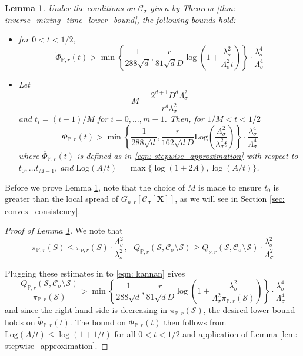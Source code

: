 \documentclass{article}
\newcommand{\1}{\mathbf{1}}
\newcommand{\Log}{\mathrm{Log}}
\newcommand{\Xbf}{\mathbf{X}}
\newcommand{\Pbb}{\mathbb{P}}
\newcommand{\Sset}{\mathcal{S}}
\newcommand{\Cset}{\mathcal{C}}
\newcommand{\Csig}{\Cset_{\sigma}}
\theoremstyle{aldenthm}
\newtheorem{lemma}{Lemma}
\begin{document}
\begin{lemma}
	\label{lem: continuous_conductance_lower_bound}
	Under the conditions on $\Csig$ given by Theorem \ref{thm: inverse_mixing_time_lower_bound}, the following bounds hold: 
	\begin{itemize}
		\item 
		for $0 < t < 1/2$,
		\begin{equation*}
		\widetilde{\Phi}_{\Pbb,r}(t) > \min\left\{\frac{1}{288\sqrt{d}},\frac{r}{81 \sqrt{d}D}\log\left(1 + \frac{\lambda_{\sigma}^2}{\Lambda_{\sigma}^2 t}\right)\right\} \cdot \frac{\lambda_{\sigma}^4}{\Lambda_{\sigma}^4}
		\end{equation*}
		\item
		Let
		\begin{equation*}
		M = \frac{2^{d+1}D^d \Lambda_{\sigma}^2}{r^d \lambda_{\sigma}^2}
		\end{equation*}
		and $t_i = (i + 1)/M$ for $i = 0, \ldots, m - 1$. Then, for $1/M < t < 1/2$
		\begin{equation*}
		\overline{\Phi}_{\Pbb,r}(t) > \min\left\{\frac{1}{288\sqrt{d}},\frac{r}{162 \sqrt{d}D}\Log\left( \frac{\Lambda_{\sigma}^2}{\lambda_{\sigma}^2 t}\right)\right\} \cdot \frac{\lambda_{\sigma}^4}{\Lambda_{\sigma}^4}
		\end{equation*}
		where $\overline{\Phi}_{\Pbb,r}(t)$ is defined as in \eqref{eqn: stepwise_approximation} with respect to $t_0, \ldots t_{M - 1}$, and $\Log(A/t) = \max\{\log(1 + 2A), \log(A/t)\}$.
	\end{itemize}
\end{lemma}
Before we prove Lemma \ref{lem: continuous_conductance_lower_bound}, note that the choice of $M$ is made to ensure $t_0$ is greater than the local spread of $G_{n,r}\left[\Csig[\Xbf]\right]$, as we will see in Section \ref{sec: convex_consistency}.
\begin{proof}[Proof of Lemma \ref{lem: continuous_conductance_lower_bound}]
	We note that
	\begin{equation*}
	\pi_{\Pbb,r}(S) \leq \pi_{\nu,r}(S) \cdot \frac{\Lambda_{\sigma}^2}{\lambda_{\sigma}^2}, ~~~ Q_{\Pbb,r}(\Sset, \Csig \setminus \Sset) \geq Q_{\nu,r}(\Sset, \Csig \setminus \Sset) \cdot \frac{\lambda_{\sigma}^2}{\Lambda_{\sigma}^2}
	\end{equation*}
	
	Plugging these estimates in to \eqref{eqn: kannan} gives
	\begin{equation*}
	\frac{Q_{\Pbb,r}(\Sset, \Csig \setminus \Sset)}{\pi_{\Pbb,r}(\Sset)} > \min\left\{\frac{1}{288\sqrt{d}},\frac{r}{81 \sqrt{d}D}\log\left(1 + \frac{\lambda_{\sigma}^2}{\Lambda_{\sigma}^2 \pi_{\Pbb,r}(\Sset)}\right)\right\} \cdot \frac{\lambda_{\sigma}^4}{\Lambda_{\sigma}^4}
	\end{equation*}
	and since the right hand side is decreasing in $\pi_{\Pbb,r}(\Sset)$, the desired lower bound holds on $\widetilde{\Phi}_{\Pbb,r}(t)$.  The bound on $\overline{\Phi}_{\Pbb,r}(t)$ then follows from  $\Log(A/t) \leq \log(1 + 1/t)$ for all $0 < t < 1/2$ and application of Lemma \ref{lem: stepwise_approximation}.
\end{proof}
\end{document}
